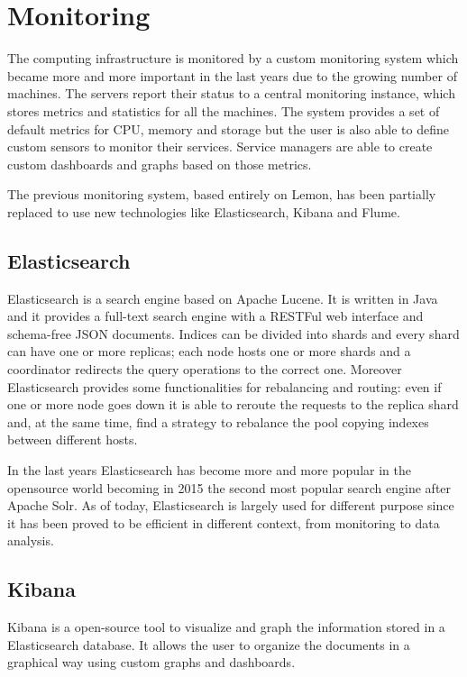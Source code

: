 \section{Monitoring}

The computing infrastructure is monitored by a custom monitoring system
which became more and more important in the last years due to the growing
number of machines. The servers report their status to a central
monitoring instance, which stores metrics and statistics for all the
machines. The system provides a set of default metrics for CPU, memory and
storage but the user is also able to define custom sensors to monitor
their services. Service managers are able to create custom dashboards and
graphs based on those metrics.

The previous monitoring system, based entirely on Lemon, has been
partially replaced to use new technologies like Elasticsearch, Kibana and
Flume. 

\subsection{Elasticsearch}

Elasticsearch \cite{ElasticsearchWebsite} is a search engine based on
Apache Lucene. It is written in Java and it provides a full-text search
engine with a RESTFul web interface and schema-free JSON documents.
Indices can be divided into shards and every shard can have one or more
replicas; each node hosts one or more shards and a coordinator redirects
the query operations to the correct one. Moreover Elasticsearch provides
some functionalities for rebalancing and routing: even if one or more node
goes down it is able to reroute the requests to the replica shard and, at
the same time, find a strategy to rebalance the pool copying indexes
between different hosts.

In the last years Elasticsearch has become more and more popular in the
opensource world becoming in 2015 the second most popular search engine
after Apache Solr. As of today, Elasticsearch is largely used for
different purpose since it has been proved to be efficient in different
context, from monitoring to data analysis.

\subsection{Kibana}

Kibana \cite{KibanaWebsite} is a open-source tool to visualize and graph
the information stored in a Elasticsearch database. It allows the user to
organize the documents in a graphical way using custom graphs and
dashboards.

